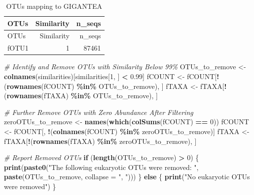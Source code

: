 \documentclass[
  11pt,
]{article}
\newenvironment{Shaded}{\begin{snugshade}}{\end{snugshade}}
\newcommand{\AttributeTok}[1]{\textcolor[rgb]{0.13,0.29,0.53}{#1}}
\newcommand{\CommentTok}[1]{\textcolor[rgb]{0.56,0.35,0.01}{\textit{#1}}}
\newcommand{\ControlFlowTok}[1]{\textcolor[rgb]{0.13,0.29,0.53}{\textbf{#1}}}
\newcommand{\DecValTok}[1]{\textcolor[rgb]{0.00,0.00,0.81}{#1}}
\newcommand{\FloatTok}[1]{\textcolor[rgb]{0.00,0.00,0.81}{#1}}
\newcommand{\FunctionTok}[1]{\textcolor[rgb]{0.13,0.29,0.53}{\textbf{#1}}}
\newcommand{\NormalTok}[1]{#1}
\newcommand{\OtherTok}[1]{\textcolor[rgb]{0.56,0.35,0.01}{#1}}
\newcommand{\SpecialCharTok}[1]{\textcolor[rgb]{0.81,0.36,0.00}{\textbf{#1}}}
\newcommand{\StringTok}[1]{\textcolor[rgb]{0.31,0.60,0.02}{#1}}
\begin{document}
\begin{longtable}[]{@{}lrr@{}}
\caption{OTUs mapping to GIGANTEA}\tabularnewline
\toprule\noalign{}
OTUs & Similarity & n\_seqs \\
\midrule\noalign{}
\endfirsthead
\toprule\noalign{}
OTUs & Similarity & n\_seqs \\
\midrule\noalign{}
\endhead
\bottomrule\noalign{}
\endlastfoot
fOTU1 & 1 & 87461 \\
\end{longtable}

\begin{Shaded}
\begin{Highlighting}[]
\CommentTok{\# Identify and Remove OTUs with Similarity Below 99\%}
\NormalTok{OTUs\_to\_remove }\OtherTok{\textless{}{-}} \FunctionTok{colnames}\NormalTok{(similarities)[similarities[}\DecValTok{1}\NormalTok{, ] }\SpecialCharTok{\textless{}} \FloatTok{0.99}\NormalTok{]}
\NormalTok{fCOUNT }\OtherTok{\textless{}{-}}\NormalTok{ fCOUNT[}\SpecialCharTok{!}\NormalTok{(}\FunctionTok{rownames}\NormalTok{(fCOUNT) }\SpecialCharTok{\%in\%}\NormalTok{ OTUs\_to\_remove), ]}
\NormalTok{fTAXA }\OtherTok{\textless{}{-}}\NormalTok{ fTAXA[}\SpecialCharTok{!}\NormalTok{(}\FunctionTok{rownames}\NormalTok{(fTAXA) }\SpecialCharTok{\%in\%}\NormalTok{ OTUs\_to\_remove), ]}

\CommentTok{\# Further Remove OTUs with Zero Abundance After Filtering}
\NormalTok{zeroOTUs\_to\_remove }\OtherTok{\textless{}{-}} \FunctionTok{names}\NormalTok{(}\FunctionTok{which}\NormalTok{(}\FunctionTok{colSums}\NormalTok{(fCOUNT) }\SpecialCharTok{==} \DecValTok{0}\NormalTok{))}
\NormalTok{fCOUNT }\OtherTok{\textless{}{-}}\NormalTok{ fCOUNT[, }\SpecialCharTok{!}\NormalTok{(}\FunctionTok{colnames}\NormalTok{(fCOUNT) }\SpecialCharTok{\%in\%}\NormalTok{ zeroOTUs\_to\_remove)]}
\NormalTok{fTAXA }\OtherTok{\textless{}{-}}\NormalTok{ fTAXA[}\SpecialCharTok{!}\NormalTok{(}\FunctionTok{rownames}\NormalTok{(fTAXA) }\SpecialCharTok{\%in\%}\NormalTok{ zeroOTUs\_to\_remove), ]}

\CommentTok{\# Report Removed OTUs}
\ControlFlowTok{if}\NormalTok{ (}\FunctionTok{length}\NormalTok{(OTUs\_to\_remove) }\SpecialCharTok{\textgreater{}} \DecValTok{0}\NormalTok{) \{}
  \FunctionTok{print}\NormalTok{(}\FunctionTok{paste0}\NormalTok{(}\StringTok{"The following eukaryotic OTUs were removed: "}\NormalTok{, }\FunctionTok{paste}\NormalTok{(OTUs\_to\_remove, }\AttributeTok{collapse =} \StringTok{", "}\NormalTok{)))}
\NormalTok{\} }\ControlFlowTok{else}\NormalTok{ \{}
  \FunctionTok{print}\NormalTok{(}\StringTok{"No eukaryotic OTUs were removed"}\NormalTok{)}
\NormalTok{\}}
\end{Highlighting}
\end{Shaded}
\end{document}
